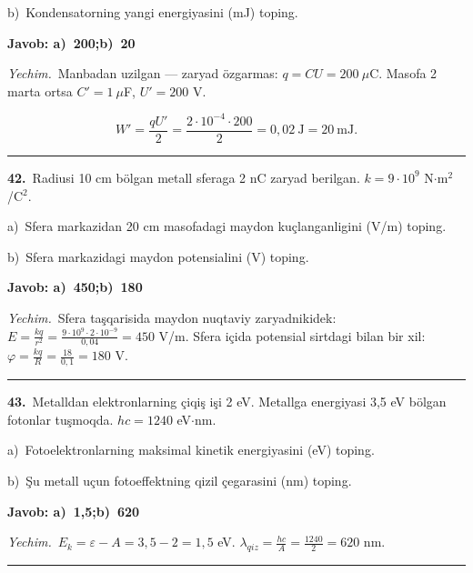 \documentclass[11pt,a4paper]{article}
\begin{document}
\noindent\hspace*{4mm}b)\ Kondensatorning yangi energiyasini (mJ) toping.\par
\noindent\colorbox{gray!12}{\parbox{\dimexpr\linewidth-2\fboxsep}{\textbf{Javob: a)\ 200;\quad b)\ 20}}}\par\smallskip
\noindent\textit{Yechim.}\ Manbadan uzilgan — zaryad özgarmas: $q=CU=200\ \mu$C. Masofa 2 marta ortsa $C'=1\ \mu$F, $U'=200$ V.\par
\[W'=\frac{qU'}{2}=\frac{2\cdot10^{-4}\cdot200}{2}=0{,}02\ \text{J}=20\ \text{mJ}.\]\par\medskip\hrule\medskip
{}\noindent\textbf{42.}\ Radiusi 10 cm bölgan metall sferaga 2 nC zaryad berilgan. $k=9\cdot10^9$ N$\cdot$m$^2$/C$^2$.\par
\noindent\hspace*{4mm}a)\ Sfera markazidan 20 cm masofadagi maydon kuçlanganligini (V/m) toping.\par
\noindent\hspace*{4mm}b)\ Sfera markazidagi maydon potensialini (V) toping.\par
\noindent\colorbox{gray!12}{\parbox{\dimexpr\linewidth-2\fboxsep}{\textbf{Javob: a)\ 450;\quad b)\ 180}}}\par\smallskip
\noindent\textit{Yechim.}\ Sfera taşqarisida maydon nuqtaviy zaryadnikidek: $E=\frac{kq}{r^2}=\frac{9\cdot10^9\cdot2\cdot10^{-9}}{0{,}04}=450$ V/m. Sfera içida potensial sirtdagi bilan bir xil: $\varphi=\frac{kq}{R}=\frac{18}{0{,}1}=180$ V.\par\par\medskip\hrule\medskip
{}\noindent\textbf{43.}\ Metalldan elektronlarning çiqiş işi 2 eV. Metallga energiyasi 3,5 eV bölgan fotonlar tuşmoqda. $hc=1240$ eV$\cdot$nm.\par
\noindent\hspace*{4mm}a)\ Fotoelektronlarning maksimal kinetik energiyasini (eV) toping.\par
\noindent\hspace*{4mm}b)\ Şu metall uçun fotoeffektning qizil çegarasini (nm) toping.\par
\noindent\colorbox{gray!12}{\parbox{\dimexpr\linewidth-2\fboxsep}{\textbf{Javob: a)\ 1,5;\quad b)\ 620}}}\par\smallskip
\noindent\textit{Yechim.}\ $E_k=\varepsilon-A=3{,}5-2=1{,}5$ eV. $\lambda_{qiz}=\frac{hc}{A}=\frac{1240}{2}=620$ nm.\par\par\medskip\hrule\medskip
\end{document}

